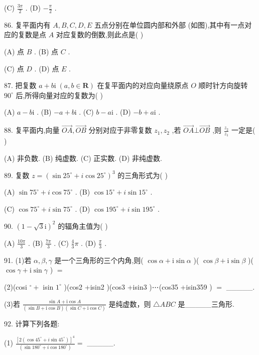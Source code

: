 \documentclass[10pt]{article}
\begin{document}
(C) \(\frac{3\pi }{2}\) . (D) \(- \frac{\pi }{2}\) .

86. 复平面内有 \(A,B,C,D,E\) 五点分别在单位圆内部和外部 (如图),其中有一点对应的复数是点 \(A\) 对应复数的倒数,则此点是( )

(A) 点 \(B\) . (B) 点 \(C\) .

(C) 点 \(D\) . (D) 点 \(E\) .

87. 把复数 \(a + b\mathrm{i}\;\left( {a,b \in  \mathbf{R}}\right)\) 在复平面内的对应向量绕原点 \(O\) 顺时针方向旋转 \({90}^{ \circ  }\) 后,所得向量对应的复数为( )

(A) \(a - b\mathrm{i}\) . (B) \(- a + b\mathrm{i}\) . (C) \(b - a\mathrm{i}\) . (D) \(- b + a\mathrm{i}\) .

88. 复平面内,向量 \(\overrightarrow{OA},\overrightarrow{OB}\) 分别对应于非零复数 \({z}_{1},{z}_{2}\) ,若 \(\overrightarrow{OA} \bot  \overrightarrow{OB}\) ,则 \(\frac{{z}_{2}}{{z}_{1}}\) 一定是( )

(A) 非负数. (B) 纯虚数. (C) 正实数. (D) 非纯虚数.

89. 复数 \(z = {\left( \sin {25}^{ \circ  } + i\cos {25}^{ \circ  }\right) }^{3}\) 的三角形式为( )

(A) \(\sin {75}^{ \circ  } + i\cos {75}^{ \circ  }\) . (B) \(\cos {15}^{ \circ  } + i\sin {15}^{ \circ  }\) .

(C) \(\cos {75}^{ \circ  } + i\sin {75}^{ \circ  }\) . (D) \(\cos {195}^{ \circ  } + i\sin {195}^{ \circ  }\) .

90. \({\left( 1 - \sqrt{3}\mathrm{i}\right) }^{2}\) 的辐角主值为( )

(A) \(\frac{10\pi }{3}\) . (B) \(\frac{7\pi }{3}\) . (C) \(\frac{4}{3}\pi\) . (D) \(\frac{\pi }{3}\) .

91. (1)若 \(\alpha ,\beta ,\gamma\) 是一个三角形的三个内角,则( \(\cos \alpha  + \mathrm{i}\sin \alpha\) )( \(\cos \beta  + \mathrm{i}\sin \beta\) )( \(\cos \gamma  + \mathrm{i}\sin \gamma\) ) \(=\)

(2)(cosi \({}^{ \circ  } +\) isin \({1}^{ \circ  }\) )(cos2 \textdegree +isin2 \textdegree )(cos3 \textdegree +isin3 \textdegree )⋯(cos35 \textdegree +isin359 \textdegree ) \(=\) \_\_\_\_\_.

(3)若 \(\frac{\sin A + \mathrm{i}\cos A}{\left( {\sin B + \mathrm{i}\cos B}\right) \left( {\sin C + \mathrm{i}\cos C}\right) }\) 是纯虚数，则 \(\bigtriangleup  {ABC}\) 是\_\_\_\_\_三角形.

92. 计算下列各题:

(1) \(\frac{{\left\lbrack  2\left( \cos {45}^{ \circ  } + i\sin {45}^{ \circ  }\right) \right\rbrack  }^{4}}{\left( \sin {180}^{ \circ  } + i\cos {180}^{ \circ  }\right) } =\) \_\_\_\_\_.
\end{document}
